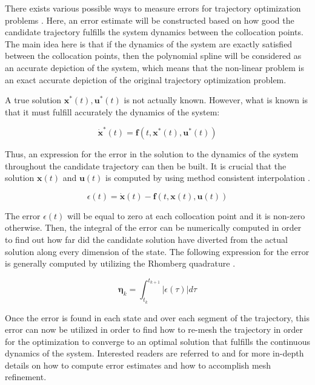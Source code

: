 \documentclass{thesisreport}
\begin{document}
There exists various possible ways to measure errors for trajectory optimization problems \cite{Betts2010}. Here, an error estimate will be constructed based on how good the candidate trajectory fulfills the system dynamics between the collocation points. The main idea here is that if the dynamics of the system are exactly satisfied between the collocation points, then the polynomial spline will be considered as an accurate depiction of the system, which means that the non-linear problem is an exact accurate depiction of the original trajectory optimization problem.

A true solution $\bm{x}^*(t),\bm{u}^*(t)$ is not actually known. However, what is known is that it must fulfill accurately the dynamics of the system:

\begin{equation*}
\dot{\bm{x}}^*(t) = \bm{f}(t,\bm{x}^*(t),\bm{u}^*(t))
\end{equation*}

Thus, an expression for the error in the solution to the dynamics of the system throughout the candidate trajectory can then be built. It is crucial that the solution $\bm{x}(t)$ and $\bm{u}(t)$ is computed by using method consistent interpolation \cite{Betts2010}.

\begin{equation*}
	\epsilon (t) = \dot{\bm{x}}(t) - \bm{f}(t,\bm{x}(t), \bm{u}(t))
\end{equation*}

The error $\epsilon(t)$ will be equal to zero at each collocation point and it is non-zero otherwise. Then, the integral of the error can be numerically computed in order to find out how far did the candidate solution have diverted from the actual solution along every dimension of the state. The following expression for the error is generally  computed by utilizing the Rhomberg quadrature \cite{Betts2010}.

\begin{equation*}
	\bm{\eta}_k = \int_{t_k}^{t_{k+1}} | \epsilon (\tau) | d \tau
\end{equation*}

Once the error is found in each state and over each segment of the trajectory, this error can now be utilized in order to find how to re-mesh the trajectory in order for the optimization to converge to an optimal solution that fulfills the continuous dynamics of the system. Interested readers are referred to \cite{Betts2010} and \cite{Darby2011} for more in-depth details on how to compute error estimates and how to accomplish mesh refinement.
\end{document}
